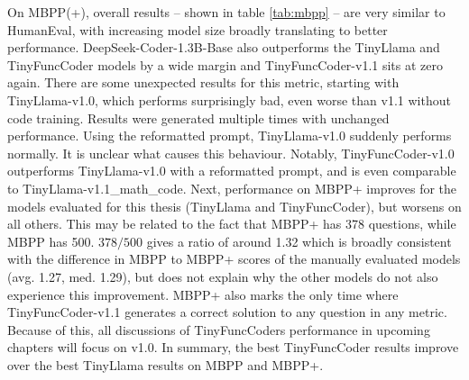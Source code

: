 On MBPP(+), overall results -- shown in table \ref{tab:mbpp} -- are very similar to HumanEval, with increasing model size broadly translating to better performance.
DeepSeek-Coder-1.3B-Base also outperforms the TinyLlama and TinyFuncCoder models by a wide margin and TinyFuncCoder-v1.1 sits at zero again.
There are some unexpected results for this metric, starting with TinyLlama-v1.0, which performs surprisingly bad, even worse than v1.1 without code training.
Results were generated multiple times with unchanged performance.
Using the reformatted prompt, TinyLlama-v1.0 suddenly performs normally.
It is unclear what causes this behaviour.
Notably, TinyFuncCoder-v1.0 outperforms TinyLlama-v1.0 with a reformatted prompt, and is even comparable to TinyLlama-v1.1\_math\_code.
Next, performance on MBPP+ improves for the models evaluated for this thesis (TinyLlama and TinyFuncCoder), but worsens on all others.
This may be related to the fact that MBPP+ has 378 questions, while MBPP has 500.
$378/500$ gives a ratio of around 1.32 which is broadly consistent with the difference in MBPP to MBPP+ scores of the manually evaluated models (avg. 1.27, med. 1.29), but does not explain why the other models do not also experience this improvement.
MBPP+ also marks the only time where TinyFuncCoder-v1.1 generates a correct solution to any question in any metric.
Because of this, all discussions of TinyFuncCoders performance in upcoming chapters will focus on v1.0.
In summary, the best TinyFuncCoder results improve over the best TinyLlama results on MBPP and MBPP+.

